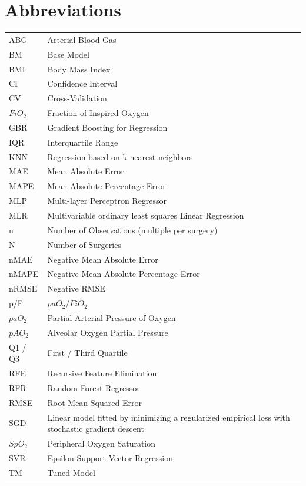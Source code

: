 \documentclass[referee,lineno,pdflatex,sn-nature]{sn-jnl}%
\theoremstyle{thmstyleone}%
\theoremstyle{thmstyletwo}%
\theoremstyle{thmstylethree}%
\begin{document}
\section*{Abbreviations}\label{abb}
\begin{table}[h]
\begin{tabular}{|l|l|}
    \hline
    ABG & Arterial Blood Gas \\
    BM & Base Model \\
    BMI & Body Mass Index \\
    CI & Confidence Interval \\
    CV & Cross-Validation \\
    $FiO_2$ & Fraction of Inspired Oxygen \\
    GBR & Gradient Boosting for Regression \\
    IQR & Interquartile Range \\
    KNN & Regression based on k-nearest neighbors \\
    MAE & Mean Absolute Error \\
    MAPE & Mean Absolute Percentage Error \\
    MLP & Multi-layer Perceptron Regressor \\
    MLR & Multivariable ordinary least squares Linear Regression \\
    n & Number of Observations (multiple per surgery) \\
    N & Number of Surgeries \\
    nMAE & Negative Mean Absolute Error \\
    nMAPE & Negative Mean Absolute Percentage Error \\
    nRMSE & Negative RMSE \\
    p/F & $paO_2/FiO_2$ \\
    $paO_2$ & Partial Arterial Pressure of Oxygen  \\
    $pAO_2$ & Alveolar Oxygen Partial Pressure  \\
    Q1 / Q3 & First / Third Quartile \\
    RFE & Recursive Feature Elimination \\
    RFR & Random Forest Regressor \\
    RMSE & Root Mean Squared Error \\
    SGD & Linear model fitted by minimizing a regularized empirical loss with stochastic gradient descent \\
    $SpO_2$ & Peripheral Oxygen Saturation \\
    SVR & Epsilon-Support Vector Regression \\
    TM & Tuned Model \\
    \hline
\end{tabular}
\end{table}
\end{document}
